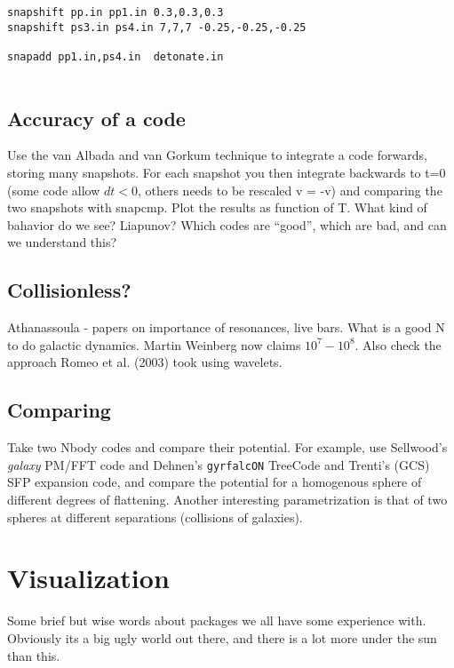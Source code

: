\begin{itemize}
\begin{itemize}
\begin{verbatim}
snapshift pp.in pp1.in 0.3,0.3,0.3
snapshift ps3.in ps4.in 7,7,7 -0.25,-0.25,-0.25

snapadd pp1.in,ps4.in  detonate.in


\end{verbatim}\normalsize  

\section{Accuracy of a code}

Use the van Albada and van Gorkum technique to integrate a code
forwards, storing many snapshots. For each snapshot you then integrate
backwards to t=0 (some code allow $dt<0$, others needs to be
rescaled v = -v) and comparing the two snapshots with snapcmp.
Plot the results as function of T. What kind of bahavior do we see?
Liapunov?  Which codes are ``good'', which are bad, and can we 
understand this?


\section{Collisionless?}

Athanassoula - papers on importance of resonances, live bars. What is a good N to do
galactic dynamics. Martin Weinberg now claims $10^7-10^8$. 
Also check the approach Romeo et al. (2003) took using wavelets.

\section{Comparing}

Take two Nbody codes and compare their potential. For example, use Sellwood's 
{\it galaxy} PM/FFT code and Dehnen's {\tt gyrfalcON} TreeCode and Trenti's
(GCS) SFP expansion code,
and compare the
potential for a homogenous sphere of different degrees of flattening.
Another interesting parametrization is that of two spheres at
different separations (collisions of galaxies).


\chapter                {Visualization}

Some brief but wise words about packages we all have some experience with.
Obviously its a big ugly world out there, and there is a lot more under the
sun than this.


\end{itemize}
\end{itemize}

